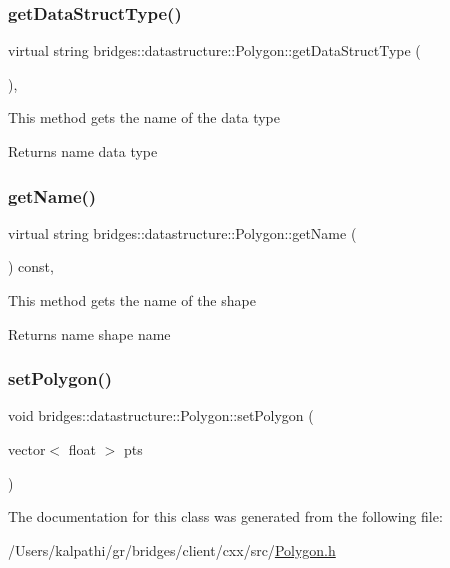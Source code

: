 \subsubsection{\texorpdfstring{get\+Data\+Struct\+Type()}{getDataStructType()}}
{\footnotesize\ttfamily virtual string bridges\+::datastructure\+::\+Polygon\+::get\+Data\+Struct\+Type (\begin{DoxyParamCaption}{ }\end{DoxyParamCaption})\hspace{0.3cm}{\ttfamily [inline]}, {\ttfamily [virtual]}}

This method gets the name of the data type

\begin{DoxyReturn}{Returns}
name data type 
\end{DoxyReturn}
\mbox{\label{classbridges_1_1datastructure_1_1_polygon_a9e11131b2a1f3b6044913577f51546c3}} 
\subsubsection{\texorpdfstring{get\+Name()}{getName()}}
{\footnotesize\ttfamily virtual string bridges\+::datastructure\+::\+Polygon\+::get\+Name (\begin{DoxyParamCaption}{ }\end{DoxyParamCaption}) const\hspace{0.3cm}{\ttfamily [inline]}, {\ttfamily [virtual]}}

This method gets the name of the shape

\begin{DoxyReturn}{Returns}
name shape name 
\end{DoxyReturn}
\mbox{\label{classbridges_1_1datastructure_1_1_polygon_a058a8ec2340f15f45dab27b18978055c}} 
\subsubsection{\texorpdfstring{set\+Polygon()}{setPolygon()}}
{\footnotesize\ttfamily void bridges\+::datastructure\+::\+Polygon\+::set\+Polygon (\begin{DoxyParamCaption}\item[{vector$<$ float $>$}]{pts }\end{DoxyParamCaption})\hspace{0.3cm}{\ttfamily [inline]}}



The documentation for this class was generated from the following file\+:\begin{DoxyCompactItemize}
\item 
/\+Users/kalpathi/gr/bridges/client/cxx/src/\mbox{\hyperlink{_polygon_8h}{Polygon.\+h}}\end{DoxyCompactItemize}
